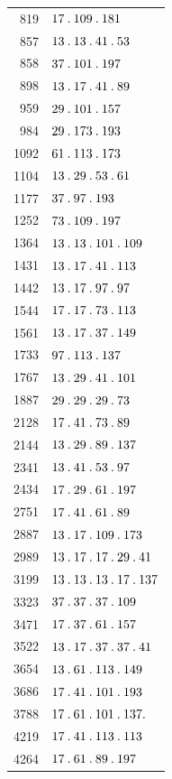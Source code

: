 \begin{longtable}{@{}r|l@{}}
819 & $17\mathbin{.} 109\mathbin{.} 181$\\
857 & $13\mathbin{.} 13\mathbin{.} 41\mathbin{.} 53$\\
858 & $37\mathbin{.} 101\mathbin{.} 197$\\
898 & $13\mathbin{.} 17\mathbin{.} 41\mathbin{.} 89$\\
959 & $29\mathbin{.} 101\mathbin{.} 157$\\
984 & $29\mathbin{.} 173\mathbin{.} 193$\\
1092 & $61\mathbin{.} 113\mathbin{.} 173$\\
1104 & $13\mathbin{.} 29\mathbin{.} 53\mathbin{.} 61$\\
1177 & $37\mathbin{.} 97\mathbin{.} 193$\\
1252 & $73\mathbin{.} 109\mathbin{.} 197$\\
1364 & $13\mathbin{.} 13\mathbin{.} 101\mathbin{.} 109$\\
1431 & $13\mathbin{.} 17\mathbin{.} 41\mathbin{.} 113$\\
1442 & $13\mathbin{.} 17\mathbin{.} 97\mathbin{.} 97$\\
1544 & $17\mathbin{.} 17\mathbin{.} 73\mathbin{.} 113$\\
1561 & $13\mathbin{.} 17\mathbin{.} 37\mathbin{.} 149$\\
1733 & $97\mathbin{.} 113\mathbin{.} 137$\\
1767 & $13\mathbin{.} 29\mathbin{.} 41\mathbin{.} 101$\\
1887 & $29\mathbin{.} 29\mathbin{.} 29\mathbin{.} 73$\\
2128 & $17\mathbin{.} 41\mathbin{.} 73\mathbin{.} 89$\\
2144 & $13\mathbin{.} 29\mathbin{.} 89\mathbin{.} 137$\\
2341 & $13\mathbin{.} 41\mathbin{.} 53\mathbin{.} 97$\\
2434 & $17\mathbin{.} 29\mathbin{.} 61\mathbin{.} 197$\\
2751 & $17\mathbin{.} 41\mathbin{.} 61\mathbin{.} 89$\\
2887 & $13\mathbin{.} 17\mathbin{.} 109\mathbin{.} 173$\\
2989 & $13\mathbin{.} 17\mathbin{.} 17\mathbin{.} 29\mathbin{.} 41$\\
3199 & $13\mathbin{.} 13\mathbin{.} 13\mathbin{.} 17\mathbin{.} 137$\\
3323 & $37\mathbin{.} 37\mathbin{.} 37\mathbin{.} 109$\\
3471 & $17\mathbin{.} 37\mathbin{.} 61\mathbin{.} 157$\\
3522 & $13\mathbin{.} 17\mathbin{.} 37\mathbin{.} 37\mathbin{.} 41$\\
3654 & $13\mathbin{.} 61\mathbin{.} 113\mathbin{.} 149$\\
3686 & $17\mathbin{.} 41\mathbin{.} 101\mathbin{.} 193$\\
3788 & $17\mathbin{.} 61\mathbin{.} 101\mathbin{.} 137\mathbin{.} $\\
4219 & $17\mathbin{.} 41\mathbin{.} 113\mathbin{.} 113$\\
4264 & $17\mathbin{.} 61\mathbin{.} 89\mathbin{.} 197$\\

\end{longtable}
